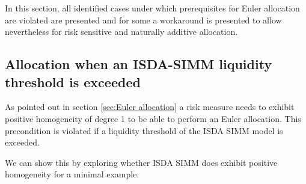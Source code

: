 \documentclass[../Thesis_AHoecherl.tex]{subfiles}
\begin{document}
    In this section, all identified cases under which prerequisites for Euler allocation are violated are presented and for some a workaround is presented to allow nevertheless for risk sensitive and naturally additive allocation.

    \subsection{Allocation when an ISDA-SIMM liquidity threshold is exceeded\label{sec:Allocation when an ISDA-SIMM liquidity threshold is exceeded}}
    
    As pointed out in section \ref{sec:Euler allocation} a risk measure needs to exhibit positive homogeneity of degree 1 to be able to perform an Euler allocation.
    This precondition is violated if a liquidity threshold of the ISDA SIMM model is exceeded.

    We can show this by exploring whether ISDA SIMM does exhibit positive homogeneity for a minimal example.
\end{document}
